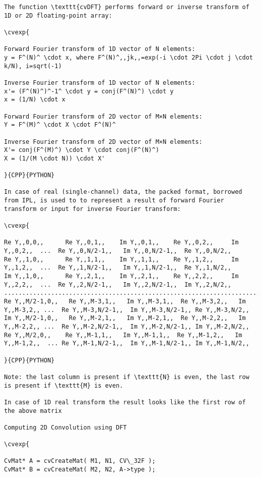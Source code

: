\begin{verbatim}
The function \texttt{cvDFT} performs forward or inverse transform of 1D or 2D floating-point array:

\cvexp{

Forward Fourier transform of 1D vector of N elements:
y = F^(N)^ \cdot x, where F^(N)^,,jk,,=exp(-i \cdot 2Pi \cdot j \cdot k/N), i=sqrt(-1)

Inverse Fourier transform of 1D vector of N elements:
x'= (F^(N)^)^-1^ \cdot y = conj(F^(N)^) \cdot y
x = (1/N) \cdot x

Forward Fourier transform of 2D vector of M×N elements:
Y = F^(M)^ \cdot X \cdot F^(N)^

Inverse Fourier transform of 2D vector of M×N elements:
X'= conj(F^(M)^) \cdot Y \cdot conj(F^(N)^)
X = (1/(M \cdot N)) \cdot X'

}{CPP}{PYTHON}

In case of real (single-channel) data, the packed format, borrowed from IPL, is used to to represent a result of forward Fourier transform or input for inverse Fourier transform:

\cvexp{

Re Y,,0,0,,      Re Y,,0,1,,    Im Y,,0,1,,    Re Y,,0,2,,     Im Y,,0,2,,  ...  Re Y,,0,N/2-1,,   Im Y,,0,N/2-1,,  Re Y,,0,N/2,,
Re Y,,1,0,,      Re Y,,1,1,,    Im Y,,1,1,,    Re Y,,1,2,,     Im Y,,1,2,,  ...  Re Y,,1,N/2-1,,   Im Y,,1,N/2-1,,  Re Y,,1,N/2,,
Im Y,,1,0,,      Re Y,,2,1,,    Im Y,,2,1,,    Re Y,,2,2,,     Im Y,,2,2,,  ...  Re Y,,2,N/2-1,,   Im Y,,2,N/2-1,,  Im Y,,2,N/2,,
............................................................................................
Re Y,,M/2-1,0,,   Re Y,,M-3,1,,   Im Y,,M-3,1,,  Re Y,,M-3,2,,   Im Y,,M-3,2,, ...  Re Y,,M-3,N/2-1,,  Im Y,,M-3,N/2-1,, Re Y,,M-3,N/2,,
Im Y,,M/2-1,0,,   Re Y,,M-2,1,,   Im Y,,M-2,1,,  Re Y,,M-2,2,,   Im Y,,M-2,2,, ...  Re Y,,M-2,N/2-1,,  Im Y,,M-2,N/2-1,, Im Y,,M-2,N/2,,
Re Y,,M/2,0,,    Re Y,,M-1,1,,   Im Y,,M-1,1,,  Re Y,,M-1,2,,   Im Y,,M-1,2,,  ... Re Y,,M-1,N/2-1,,  Im Y,,M-1,N/2-1,, Im Y,,M-1,N/2,,

}{CPP}{PYTHON}

Note: the last column is present if \texttt{N} is even, the last row is present if \texttt{M} is even.

In case of 1D real transform the result looks like the first row of the above matrix

Computing 2D Convolution using DFT

\cvexp{

CvMat* A = cvCreateMat( M1, N1, CV\_32F );
CvMat* B = cvCreateMat( M2, N2, A->type );


\end{verbatim}
